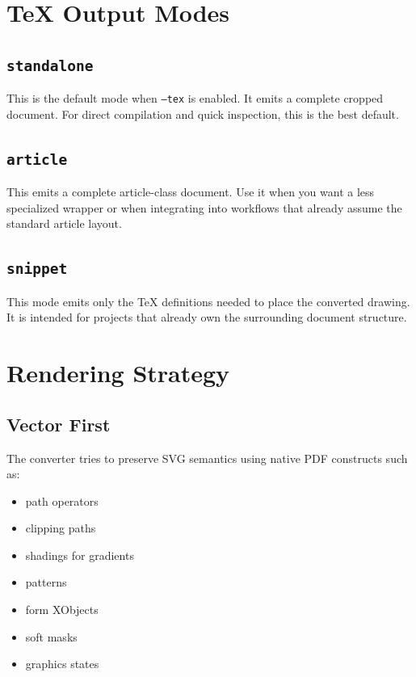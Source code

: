 \documentclass[11pt,a4paper]{article}
\newcommand{\codeheading}[1]{\textnormal{\texttt{#1}}}
\begin{document}
\section{TeX Output Modes}

\subsection{\codeheading{standalone}}

This is the default mode when \texttt{--tex} is enabled. It emits a complete cropped document.
For direct compilation and quick inspection, this is the best default.

\subsection{\codeheading{article}}

This emits a complete article-class document. Use it when you want a less specialized wrapper
or when integrating into workflows that already assume the standard article layout.

\subsection{\codeheading{snippet}}

This mode emits only the TeX definitions needed to place the converted drawing. It is intended for
projects that already own the surrounding document structure.

\section{Rendering Strategy}

\subsection{Vector First}

The converter tries to preserve SVG semantics using native PDF constructs such as:

\begin{itemize}
\item path operators
\item clipping paths
\item shadings for gradients
\item patterns
\item form XObjects
\item soft masks
\item graphics states
\end{itemize}
\end{document}
